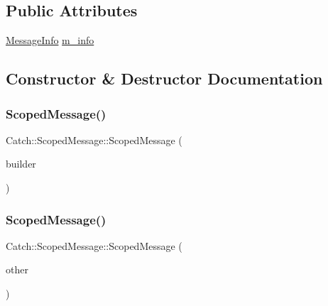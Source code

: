 \subsection*{Public Attributes}
\begin{DoxyCompactItemize}
\item 
\hyperlink{struct_catch_1_1_message_info}{Message\+Info} \hyperlink{class_catch_1_1_scoped_message_ae6e1476f389cc6e1586f033b3747b27b}{m\+\_\+info}
\end{DoxyCompactItemize}


\subsection{Constructor \& Destructor Documentation}
\mbox{\label{class_catch_1_1_scoped_message_a5cc59f0f2ebe840e6607f83004d49a17}} 
\subsubsection{\texorpdfstring{Scoped\+Message()}{ScopedMessage()}\hspace{0.1cm}{\footnotesize\ttfamily [1/2]}}
{\footnotesize\ttfamily Catch\+::\+Scoped\+Message\+::\+Scoped\+Message (\begin{DoxyParamCaption}\item[{\hyperlink{struct_catch_1_1_message_builder}{Message\+Builder} const \&}]{builder }\end{DoxyParamCaption})}

\mbox{\label{class_catch_1_1_scoped_message_ae03a17fd47220d563d4abc73e7518e29}} 
\subsubsection{\texorpdfstring{Scoped\+Message()}{ScopedMessage()}\hspace{0.1cm}{\footnotesize\ttfamily [2/2]}}
{\footnotesize\ttfamily Catch\+::\+Scoped\+Message\+::\+Scoped\+Message (\begin{DoxyParamCaption}\item[{\hyperlink{class_catch_1_1_scoped_message}{Scoped\+Message} const \&}]{other }\end{DoxyParamCaption})}

